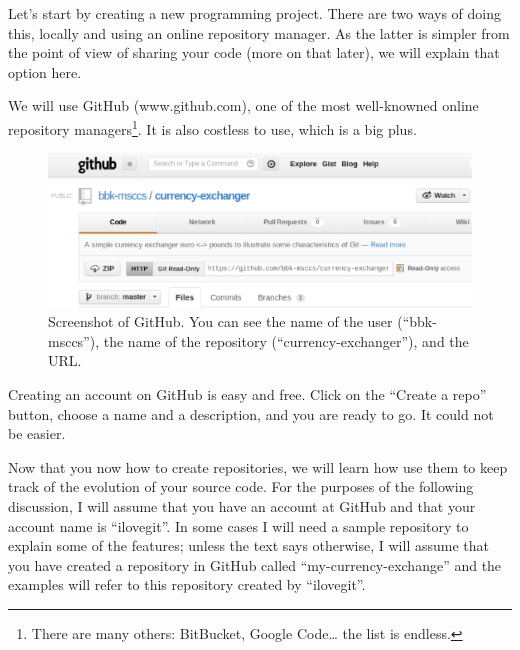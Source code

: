 Let's start by creating a new programming project. There are two ways
of doing this, locally and using an online repository manager. As the
latter is simpler from the point of view of sharing your code (more on
that later), we will explain that option here. 

We will use GitHub (www.github.com), 
one of the most well-knowned online repository
managers\footnote{There are many others: BitBucket, Google Code\ldots
  the list is endless.}. 
It is also costless to use, which is a big plus. 

\begin{figure}[htbp]
  \centering
  \includegraphics[width=\textwidth]{gfx/gitHubScreenshot.eps}
  \caption{Screenshot of GitHub. You can see the name of the user
    (``bbk-msccs''), the name of the repository
    (``currency-exchanger''), and the URL. 
    }
  \label{fig:github}
\end{figure}

Creating an account on GitHub is easy and free. Click on the ``Create
a repo'' button, choose a name and a description, and you are ready to
go. It could not be easier. 

Now that you now how to create repositories, we will learn how use
them to keep track of the evolution of your source code. For the
purposes of the following discussion, I will assume that you have an
account at GitHub and that your account name is ``ilovegit''.  In some
cases I will need a sample repository to explain some of the features;
unless the text says otherwise, I will assume that you have created a
repository in GitHub called ``my-currency-exchange'' and the examples
will refer to this repository created by ``ilovegit''.



